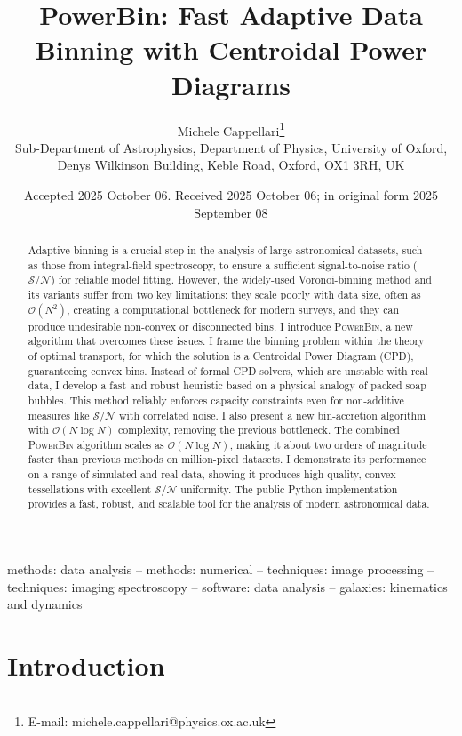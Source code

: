 \documentclass[fleqn,usenatbib]{mnras}
\title[PowerBin: Data Binning]{PowerBin: Fast Adaptive Data Binning with Centroidal Power Diagrams}
\author[M.~Cappellari]{Michele Cappellari\thanks{E-mail:
michele.cappellari@physics.ox.ac.uk}\\
Sub-Department of Astrophysics, Department of Physics, University of Oxford, Denys Wilkinson Building, Keble Road, Oxford, OX1 3RH, UK}
\date{Accepted 2025 October 06. Received 2025 October 06; in original form 2025 September 08}
\newcommand{\sn}{\mathcal{S/N}}
\begin{document}
\label{firstpage}
\maketitle

\begin{abstract}
    Adaptive binning is a crucial step in the analysis of large astronomical datasets, such as those from integral-field spectroscopy, to ensure a sufficient signal-to-noise ratio ($\sn$) for reliable model fitting. However, the widely-used Voronoi-binning method and its variants suffer from two key limitations: they scale poorly with data size, often as $\mathcal{O}(N^2)$, creating a computational bottleneck for modern surveys, and they can produce undesirable non-convex or disconnected bins. I introduce \textsc{PowerBin}, a new algorithm that overcomes these issues. I frame the binning problem within the theory of optimal transport, for which the solution is a Centroidal Power Diagram (CPD), guaranteeing convex bins. Instead of formal CPD solvers, which are unstable with real data, I develop a fast and robust heuristic based on a physical analogy of packed soap bubbles. This method reliably enforces capacity constraints even for non-additive measures like $\sn$ with correlated noise. I also present a new bin-accretion algorithm with $\mathcal{O}(N\log N)$ complexity, removing the previous bottleneck. The combined \textsc{PowerBin} algorithm scales as $\mathcal{O}(N\log N)$, making it about two orders of magnitude faster than previous methods on million-pixel datasets. I demonstrate its performance on a range of simulated and real data, showing it produces high-quality, convex tessellations with excellent $\sn$ uniformity. The public Python implementation provides a fast, robust, and scalable tool for the analysis of modern astronomical data.
\end{abstract}

\begin{keywords}
methods: data analysis -- methods: numerical -- techniques: image processing -- techniques: imaging spectroscopy -- software: data analysis -- galaxies: kinematics and dynamics
\end{keywords}

\section{Introduction}
\label{sec:intro}
\end{document}
